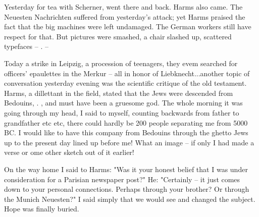 
Yesterday for tea with Scherner, went there and back. Harms also came. The Neuesten Nachrichten suffered from yesterday's attack; yet Harms praised the fact that the big machines were left undamaged. The German workers still have respect for that. But pictures were smashed, a chair slashed up, scattered typefaces -- . --

Today a strike in Leipzig, a procession of teenagers, they evem searched for officers' epaulettes in the Merkur -- all in honor of Liebknecht...another topic of conversation yesterday evening was the scientific critique of the old testament. Harms, a dillettant in the field, stated that the Jews were descended from Bedouins, . , and must have been a gruesome god. The whole morning it was going through my head, I said to myself, counting backwards from father to grandfather etc etc, there could hardly be 200 people separating me from 5000 BC. I would like to have this company from Bedouins through the ghetto Jews up to the present day lined up before me! What an image -- if only I had made a verse or ome other sketch out of it earlier!

On the way home I said to Harms: "Was it your honest belief that I was under consideration for a Parisian newspaper post?" He: "Certainly -- it just comes down to your personal connections. Perhaps through your brother? Or through the Munich Neuesten?" I said simply that we would see and changed the subject. Hope was finally buried.

\missing

